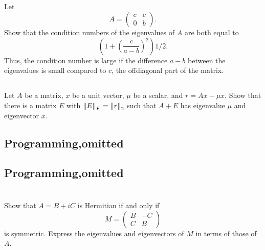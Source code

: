 \documentclass[a4paper]{ctexart}
\newcommand{\pf}{\textbf{\color{pink}{proof:}}}
\begin{document}
\pf

\subsection{}
Let 
\begin{equation*}
    A = \begin{pmatrix}
        c&c\\0&b
    \end{pmatrix}.
\end{equation*} 
Show that the condition
numbers of the eigenvalues of $A$ are both equal to 
\begin{equation*}
    (1 + (\frac{c}{a-b})^2)1/2.
\end{equation*}
Thus, the condition number is large if the difference $a-b$ between the eigenvalues is small
compared to $c$, the offdiagonal part of the matrix.

\pf

\subsection{}
Let $A$ be a matrix, $x$ be a unit vector, $\mu$ be a scalar, and $r = Ax - \mu x$. Show that there is a matrix $E$
with $\norm{E}_F = \norm{r}_2$ such that $A + E$ has eigenvalue $\mu$ and eigenvector $x$.

\pf

\subsection{Programming,omitted}
\subsection{Programming,omitted}

\section{}

\subsection{}
Show that $A = B +iC$ is Hermitian if and only if
\begin{equation*}
    M = \begin{pmatrix}
        B&-C\\C&B
    \end{pmatrix}
\end{equation*}
is symmetric. Express the eigenvalues and eigenvectors of $M$ in terms of those
of $A$.
\end{document}
